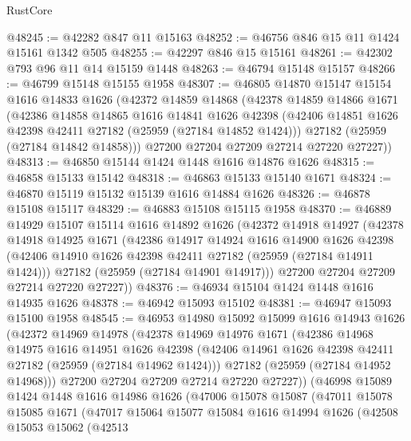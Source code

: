 \begin{lexlean}{RustCore}
\begin{coremodule}
@48245 := @42282 @847 @11 @15163
@48252 := @46756 @846 @15 @11 @1424 @15161 @1342 @505
@48255 := @42297 @846 @15 @15161
@48261 := @42302 @793 @96 @11 @14 @15159 @1448
@48263 := @46794 @15148 @15157
@48266 := @46799 @15148 @15155 @1958
@48307 := @46805
    @14870
    @15147
    @15154
    @1616
    @14833
    @1626
    (@42372
      @14859
      @14868
      (@42378
        @14859
        @14866
        @1671
        (@42386
          @14858
          @14865
          @1616
          @14841
          @1626
          @42398
          (@42406 @14851 @1626 @42398 @42411 @27182 (@25959 (@27184 @14852 @1424)))
          @27182
          (@25959 (@27184 @14842 @14858)))
        @27200
        @27204
        @27209
        @27214
        @27220
        @27227))
@48313 := @46850 @15144 @1424 @1448 @1616 @14876 @1626
@48315 := @46858 @15133 @15142
@48318 := @46863 @15133 @15140 @1671
@48324 := @46870 @15119 @15132 @15139 @1616 @14884 @1626
@48326 := @46878 @15108 @15117
@48329 := @46883 @15108 @15115 @1958
@48370 := @46889
    @14929
    @15107
    @15114
    @1616
    @14892
    @1626
    (@42372
      @14918
      @14927
      (@42378
        @14918
        @14925
        @1671
        (@42386
          @14917
          @14924
          @1616
          @14900
          @1626
          @42398
          (@42406 @14910 @1626 @42398 @42411 @27182 (@25959 (@27184 @14911 @1424)))
          @27182
          (@25959 (@27184 @14901 @14917)))
        @27200
        @27204
        @27209
        @27214
        @27220
        @27227))
@48376 := @46934 @15104 @1424 @1448 @1616 @14935 @1626
@48378 := @46942 @15093 @15102
@48381 := @46947 @15093 @15100 @1958
@48545 := @46953
    @14980
    @15092
    @15099
    @1616
    @14943
    @1626
    (@42372
      @14969
      @14978
      (@42378
        @14969
        @14976
        @1671
        (@42386
          @14968
          @14975
          @1616
          @14951
          @1626
          @42398
          (@42406 @14961 @1626 @42398 @42411 @27182 (@25959 (@27184 @14962 @1424)))
          @27182
          (@25959 (@27184 @14952 @14968)))
        @27200
        @27204
        @27209
        @27214
        @27220
        @27227))
    (@46998
      @15089
      @1424
      @1448
      @1616
      @14986
      @1626
      (@47006
        @15078
        @15087
        (@47011
          @15078
          @15085
          @1671
          (@47017
            @15064
            @15077
            @15084
            @1616
            @14994
            @1626
            (@42508
              @15053
              @15062
              (@42513

\end{coremodule}
\end{lexlean}
